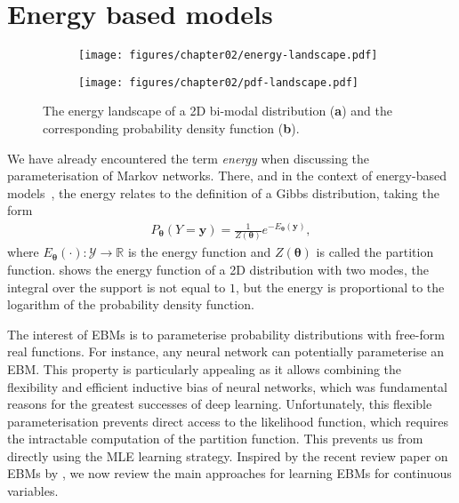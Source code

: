 \section{Energy based models}
\begin{figure*}
  \centering
  \begin{subfigure}{.48\textwidth}
    \centering
    \texttt{[image: figures/chapter02/energy-landscape.pdf]}
    \caption{}
    \label{fig:Energy}
  \end{subfigure}
  \begin{subfigure}{.48\textwidth}
    \centering
    \texttt{[image: figures/chapter02/pdf-landscape.pdf]}
    \caption{}
    \label{fig:pdf}
  \end{subfigure}
  \caption{The energy landscape of a 2D bi-modal distribution (\textbf{a}) and the corresponding probability density function (\textbf{b}).}
\end{figure*}
We have already encountered the term \textit{energy} when discussing the parameterisation of Markov networks. There, and in the context of energy-based models~\citep[][EBMs]{teh2003energy}, the energy relates to the definition of a Gibbs distribution, taking the form
\begin{align}
  P_{\bm{\theta}}(Y=\bm{y}) = \frac{1}{Z(\bm{\theta})} e^{-E_{\bm{\theta}}(\bm{y})},
\end{align}
where $E_{\bm{\theta}}(\cdot): \mathcal{Y}\rightarrow \mathbb{R}$ is the energy function and $Z(\bm{\theta})$ is called the partition function.  shows the energy function of a 2D distribution with two modes, the integral over the support is not equal to $1$, but the energy is proportional to the logarithm of the probability density function.

The interest of EBMs is to parameterise probability distributions with free-form real functions. For instance, any neural network can potentially parameterise an EBM. This property is particularly appealing as it allows combining the flexibility and efficient inductive bias of neural networks, which was fundamental reasons for the greatest successes of deep learning. Unfortunately, this flexible parameterisation prevents direct access to the likelihood function, which requires the intractable computation of the partition function. This prevents us from directly using the MLE learning strategy. Inspired by the recent review paper on EBMs by \citet{song2021train}, we now review the main approaches for learning EBMs for continuous variables.

